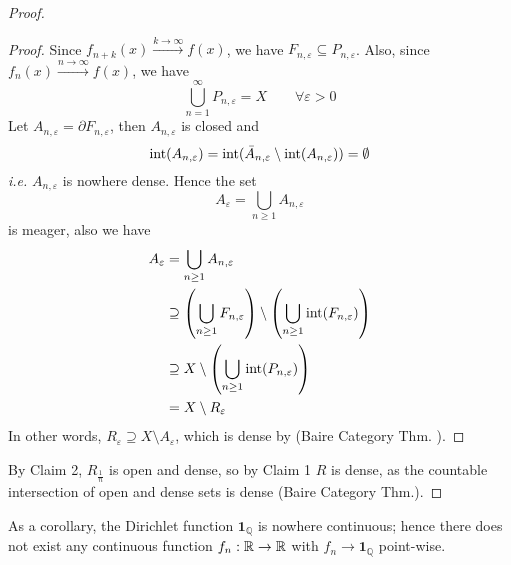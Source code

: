 \documentclass{article}
\begin{document}
\begin{proof}
\begin{proof}
        Since $f_{n+k}(x) \overset{k\to \infty}{\longrightarrow} f(x)$, we have $F_{n,\varepsilon}\subseteq P_{n, \varepsilon}$. %
        Also, since $f_n(x)\overset{n\to \infty}{\longrightarrow} f(x)$, we have 
        $$
        \bigcup_{n=1}^\infty P_{n, \varepsilon} = X \qquad  \forall \varepsilon >0
        $$
        Let $A_{n,\varepsilon} = \partial F_{n,\varepsilon}$, then $A_{n,\varepsilon}$ is closed and 
        $$
        \textrm{int}(A_{n,\varepsilon}) = \textrm{int}(\bar{A}_{n,\varepsilon} \setminus \textrm{int}(A_{n,\varepsilon})) = \emptyset
        $$  
        \textit{i.e.} $A_{n,\varepsilon}$ is nowhere dense. Hence the set 
        $$
        A_\varepsilon = \bigcup_{n\geq 1} A_{n,\varepsilon}
        $$
        is meager, also we have
        \begin{align*}
        A_\varepsilon &= \bigcup_{n\geq 1} A_{n,\varepsilon} \\
        &\supseteq \left(\bigcup_{n\geq 1} F_{n, \varepsilon}\right) \setminus \left(\bigcup_{n\geq 1} \textrm{int} (F_{n, \varepsilon}) \right) \\
        &\supseteq X \setminus \left(\bigcup_{n\geq 1} \textrm{int} (P_{n, \varepsilon}) \right) \\
        &= X \setminus R_\varepsilon
        \end{align*}
        In other words, $R_\varepsilon \supseteq X\setminus A_\varepsilon$, which is dense by (Baire Category Thm. ).  
        
    \end{proof}
    By Claim 2, $R_{\frac{1}{n}}$ is open and dense, so by Claim 1 $R$ is dense, as the countable intersection of open and dense sets is dense (Baire Category Thm.).
\end{proof}
\begin{remark}
    As a corollary, the Dirichlet function $\mathbf{1}_\mathbb{Q}$ is nowhere continuous; hence there does not exist any continuous function $f_n: \mathbb{R} \to \mathbb{R}$  with $f_n \to \mathbf{1}_\mathbb{Q}$ point-wise.
\end{remark}
\end{document}
